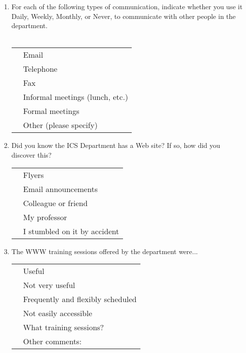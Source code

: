 \begin{enumerate}
\item{For each of the following types of communication, indicate whether
  you use it Daily, Weekly, Monthly, or Never, to communicate with other
  people in the department.}\\
\\
  \begin{tabular}{ll}
    \underline{  }\underline{  }\underline{  }  & Email\\
    \underline{  }\underline{  }\underline{  }  & Telephone\\
    \underline{  }\underline{  }\underline{  }  & Fax\\
    \underline{  }\underline{  }\underline{  }  & Informal meetings (lunch, etc.)\\
    \underline{  }\underline{  }\underline{  }  & Formal meetings\\
    \underline{  }\underline{  }\underline{  }  & Other (please specify)\\
  \end{tabular}

\item{Did you know the ICS Department has a Web site? If so, how did you
  discover this?}\\
  \begin{tabular}{ll}
    \underline{  }\underline{  }\underline{  }  & Flyers\\
    \underline{  }\underline{  }\underline{  }  & Email announcements\\
    \underline{  }\underline{  }\underline{  }  & Colleague or friend\\
    \underline{  }\underline{  }\underline{  }  & My professor\\
    \underline{  }\underline{  }\underline{  }  & I stumbled on it by accident\\
  \end{tabular}

\item{The WWW training sessions offered by the department were...}\\
  \begin{tabular} {ll}
  \underline{  }\underline{  }\underline{  }  & Useful\\
  \underline{  }\underline{  }\underline{  }  & Not very useful\\
  \underline{  }\underline{  }\underline{  }  & Frequently and flexibly scheduled\\
  \underline{  }\underline{  }\underline{  }  & Not easily accessible\\
  \underline{  }\underline{  }\underline{  }  & What training sessions?\\
  \underline{  }\underline{  }\underline{  }  & Other comments:\\
  \end{tabular}


\end{enumerate}
